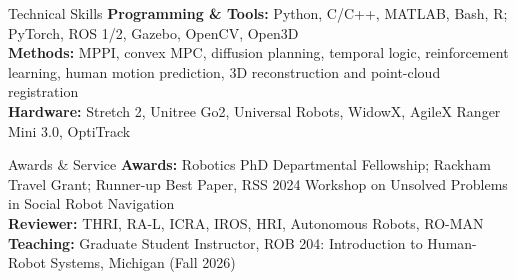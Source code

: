 \documentclass{resume}
\begin{document}
\begin{rSection}{Technical Skills}
{\bf Programming \& Tools:} Python, C/C++, MATLAB, Bash, R; PyTorch, ROS 1/2, Gazebo, OpenCV, Open3D
\\ {\bf Methods:} MPPI, convex MPC, diffusion planning, temporal logic, reinforcement learning, human motion prediction, 3D reconstruction and point-cloud registration
\\ {\bf Hardware:} Stretch 2, Unitree Go2, Universal Robots, WidowX, AgileX Ranger Mini 3.0, OptiTrack
\end{rSection}

\begin{rSection}{Awards \& Service}
{\bf Awards:} Robotics PhD Departmental Fellowship; Rackham Travel Grant; Runner-up Best Paper, RSS 2024 Workshop on Unsolved Problems in Social Robot Navigation
\\ {\bf Reviewer:} THRI, RA-L, ICRA, IROS, HRI, Autonomous Robots, RO-MAN
\\ {\bf Teaching:} Graduate Student Instructor, ROB 204: Introduction to Human-Robot Systems, Michigan (Fall 2026)
\end{rSection}
\end{document}
